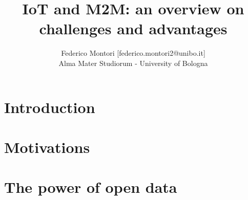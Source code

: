 \documentclass[a4paper,10pt]{article}
\title{IoT and M2M: an overview on challenges and advantages}
\author{Federico Montori [federico.montori2@unibo.it] \\ Alma Mater Studiorum - University of Bologna}
\begin{document}
\maketitle
% 
% 

\section{Introduction}

\section{Motivations}

\section{The power of open data}
\end{document}
